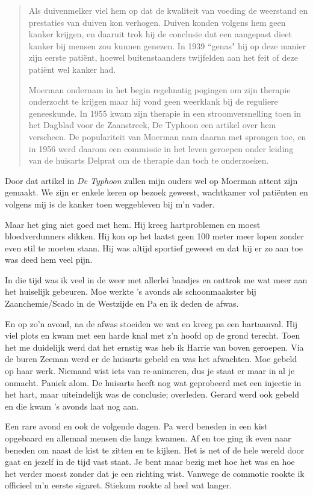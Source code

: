 \documentclass[10pt,twoside,openright]{memoir}
\begin{document}
\begin{quote}
Als duivenmelker viel hem op dat de kwaliteit van voeding de weerstand en prestaties van duiven kon verhogen. Duiven konden volgens hem geen kanker krijgen, en daaruit trok hij de conclusie dat een aangepast dieet kanker bij mensen zou kunnen genezen. In 1939 ``genas" hij op deze manier zijn eerste patiënt, hoewel buitenstaanders twijfelden aan het feit of deze patiënt wel kanker had. 

Moerman ondernam in het begin regelmatig pogingen om zijn therapie onderzocht te krijgen maar hij vond geen weerklank bij de reguliere geneeskunde. In 1955 kwam zijn therapie in een stroomversnelling toen in het Dagblad voor de Zaanstreek, De Typhoon een artikel over hem verscheen. De populariteit van Moerman nam daarna met sprongen toe, en in 1956 werd daarom een commissie in het leven geroepen onder leiding van de huisarts Delprat om de therapie dan toch te onderzoeken.
\end{quote}

Door dat artikel in \emph{De Typhoon} zullen mijn ouders wel op Moerman attent zijn gemaakt. We zijn er enkele keren op bezoek geweest, wachtkamer vol patiënten en volgens mij is de kanker toen weggebleven bij m’n vader. 

Maar het ging niet goed met hem. Hij kreeg hartproblemen en moest bloedverdunners slikken. Hij kon op het laatst geen 100 meter meer lopen zonder even stil te moeten staan. Hij was altijd sportief geweest en dat hij er zo aan toe was deed hem veel pijn.

In die tijd was ik veel in de weer met allerlei bandjes en onttrok me wat meer aan het huiselijk gebeuren. Moe werkte ’s avonds als schoonmaakster bij Zaanchemie/Scado in de Westzijde en Pa en ik deden de afwas. 

En op zo’n avond, na de afwas stoeiden we wat en kreeg pa een hartaanval. Hij viel plots en kwam met een harde knal met z’n hoofd op de grond terecht. Toen het me duidelijk werd dat het ernstig was heb ik Harrie van boven geroepen. Via de buren Zeeman werd er de huisarts gebeld en was het afwachten. Moe gebeld op haar werk. Niemand wist iets van re-animeren, dus je staat er maar in al je onmacht. Paniek alom. De huisarts heeft nog wat geprobeerd met een injectie in het hart, maar uiteindelijk was de conclusie; overleden. Gerard werd ook gebeld en die kwam ’s avonds laat nog aan. 

Een rare avond en ook de volgende dagen. Pa werd beneden in een kist opgebaard en allemaal mensen die langs kwamen. Af en toe ging ik even naar beneden om naast de kist te zitten en te kijken. Het is net of de hele wereld door gaat en jezelf in de tijd vast staat. Je bent maar bezig met hoe het was en hoe het verder moest zonder dat je een richting wist. Vanwege de commotie rookte ik officieel m’n eerste sigaret. Stiekum rookte al heel wat langer.
\end{document}
